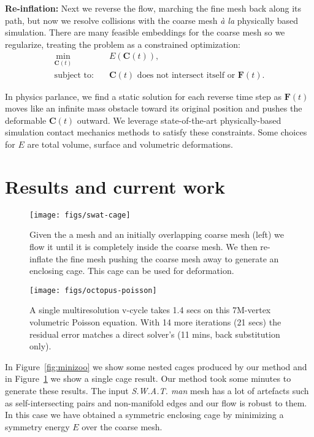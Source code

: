 \documentclass{cgyrf15}
\begin{document}
\noindent \textbf{Re-inflation:} Next we reverse the flow,
marching the fine mesh back along its path, but now we resolve collisions with
the coarse mesh \emph{\`{a} la} physically based simulation. There are many
feasible embeddings for the coarse mesh so we regularize, treating the problem
as a constrained optimization:
\begin{align}
\min_{\mathbf{C}(t)}  &\quad E(\mathbf{C}(t)),\\
\text{subject to:} &\quad \text{$\mathbf{C}(t)$ does not intersect itself or $\mathbf{F}(t)$}.
\end{align}

In physics parlance, we find a static solution for each reverse time step as
$\mathbf{F}(t)$ moves like an infinite mass obstacle toward its original
position and pushes the deformable $\mathbf{C}(t)$ outward. We leverage state-of-the-art
physically-based simulation contact mechanics methods to satisfy these
constraints. 
Some choices for $E$ are total volume, surface and volumetric deformations.

\section{Results and current work}

\begin{figure}[t]
  \texttt{[image: figs/swat-cage]}
  \caption{Given the a mesh and an initially overlapping coarse mesh (left) we
  flow it until it is completely inside the coarse mesh. We then re-inflate the
  fine mesh pushing the coarse mesh away to generate an enclosing cage. This
  cage can be used for deformation.}
  \label{fig:swat}
\end{figure}

\begin{figure}[t]
  \texttt{[image: figs/octopus-poisson]}
  \caption{A single multiresolution v-cycle takes 1.4 secs on this 7M-vertex
  volumetric Poisson equation. With 14 more iterations (21 secs) the residual
  error matches a direct solver's (11 mins, back substitution only).}
  \label{fig:octopus}
\end{figure}

In Figure~\ref{fig:minizoo} we show some nested cages produced by our method
and in Figure~\ref{fig:swat} we show a single cage result. Our method took some
minutes to generate these results. The input \emph{S.W.A.T. man} mesh has a lot
of artefacts such as self-intersecting pairs and non-manifold edges and our
flow is robust to them. In this case we have obtained a symmetric enclosing
cage by minimizing a symmetry energy $E$ over the coarse mesh.
\end{document}
